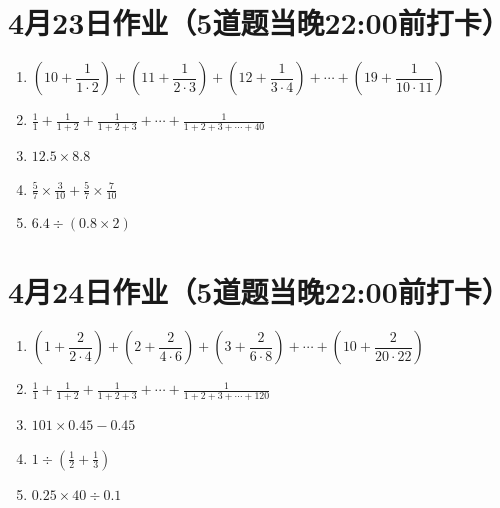 \documentclass[UTF8,12pt,a4paper]{ctexart}
\newcommand{\BottomWriteSpace}{1.8cm}
\newenvironment{OnePageFiveFill}{
  \small
  \vspace*{0pt}
  \begin{enumerate}[leftmargin=*, itemsep=0pt, topsep=0pt, parsep=0pt, partopsep=0pt]
  \setlength{\parskip}{0pt}
}{
  \end{enumerate}
  \vspace*{\BottomWriteSpace}
  \normalsize
  \newpage
}
\newcommand{\Q}[1]{\item #1\par\vfill}
\newcommand{\Qlast}[1]{\item #1\par}
\begin{document}
\section*{4月23日作业（5道题当晚22:00前打卡）}
\begin{OnePageFiveFill}

\Q{$\left(10+\dfrac{1}{1\cdot2}\right) + \left(11+\dfrac{1}{2\cdot3}\right) + \left(12+\dfrac{1}{3\cdot4}\right) + \cdots + \left(19+\dfrac{1}{10\cdot11}\right)$}

\Q{$\displaystyle \frac{1}{1}+\frac{1}{1+2}+\frac{1}{1+2+3}+\cdots+\frac{1}{1+2+3+\cdots+40}$}

\Q{$12.5 \times 8.8$}

\Q{$\displaystyle \frac{5}{7} \times \frac{3}{10} + \frac{5}{7} \times \frac{7}{10}$}

\Qlast{$6.4 \div (0.8 \times 2)$}

\end{OnePageFiveFill}

\section*{4月24日作业（5道题当晚22:00前打卡）}
\begin{OnePageFiveFill}

\Q{$\left(1+\dfrac{2}{2\cdot4}\right) + \left(2+\dfrac{2}{4\cdot6}\right) + \left(3+\dfrac{2}{6\cdot8}\right) + \cdots + \left(10+\dfrac{2}{20\cdot22}\right)$}

\Q{$\displaystyle \frac{1}{1}+\frac{1}{1+2}+\frac{1}{1+2+3}+\cdots+\frac{1}{1+2+3+\cdots+120}$}

\Q{$101 \times 0.45 - 0.45$}

\Q{$\displaystyle 1 \div \left( \frac{1}{2} + \frac{1}{3} \right)$}

\Qlast{$0.25 \times 40 \div 0.1$}

\end{OnePageFiveFill}
\end{document}
